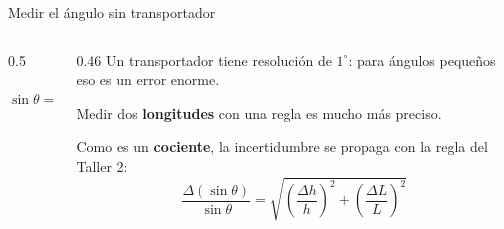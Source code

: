 \documentclass[aspectratio=169,xcolor=dvipsnames]{beamer}
\begin{document}
	\begin{frame}{Medir el ángulo sin transportador}
		\begin{columns}[T]
			\begin{column}{0.5\textwidth}
				\begin{center}
				\end{center}
				
				\vspace{0.2cm}
				\begin{exampleblock}{}
					\centering
					\Large $\sin\theta = \dfrac{h}{L}$
				\end{exampleblock}
			\end{column}
			\begin{column}{0.46\textwidth}
				\small
				Un transportador tiene resolución de $1^\circ$: para ángulos pequeños
				eso es un error enorme.
				
				\vspace{0.3cm}
				Medir dos \textbf{longitudes} con una regla es mucho más preciso.
				
				\vspace{0.3cm}
				Como es un \textbf{cociente}, la incertidumbre se propaga con la regla
				del Taller 2:
				\[
				\frac{\Delta(\sin\theta)}{\sin\theta}
				= \sqrt{\left(\frac{\Delta h}{h}\right)^{2}
					+ \left(\frac{\Delta L}{L}\right)^{2}}
				\]
			\end{column}
		\end{columns}
	\end{frame}
	
\end{document}
